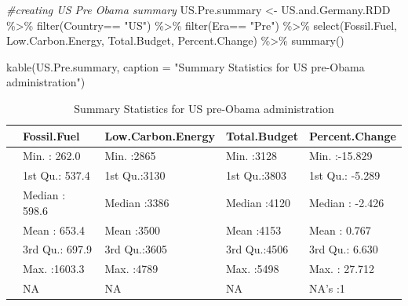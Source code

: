 \documentclass[
  12pt,
]{article}
\newenvironment{Shaded}{\begin{snugshade}}{\end{snugshade}}
\newcommand{\AttributeTok}[1]{\textcolor[rgb]{0.77,0.63,0.00}{#1}}
\newcommand{\CommentTok}[1]{\textcolor[rgb]{0.56,0.35,0.01}{\textit{#1}}}
\newcommand{\FunctionTok}[1]{\textcolor[rgb]{0.00,0.00,0.00}{#1}}
\newcommand{\NormalTok}[1]{#1}
\newcommand{\OtherTok}[1]{\textcolor[rgb]{0.56,0.35,0.01}{#1}}
\newcommand{\SpecialCharTok}[1]{\textcolor[rgb]{0.00,0.00,0.00}{#1}}
\newcommand{\StringTok}[1]{\textcolor[rgb]{0.31,0.60,0.02}{#1}}
\begin{document}
\begin{Shaded}
\begin{Highlighting}[]
\CommentTok{\#creating US Pre Obama summary}
\NormalTok{US.Pre.summary }\OtherTok{\textless{}{-}}\NormalTok{ US.and.Germany.RDD }\SpecialCharTok{\%\textgreater{}\%}
  \FunctionTok{filter}\NormalTok{(Country}\SpecialCharTok{==} \StringTok{"US"}\NormalTok{) }\SpecialCharTok{\%\textgreater{}\%}
  \FunctionTok{filter}\NormalTok{(Era}\SpecialCharTok{==} \StringTok{"Pre"}\NormalTok{) }\SpecialCharTok{\%\textgreater{}\%}
  \FunctionTok{select}\NormalTok{(Fossil.Fuel, Low.Carbon.Energy, Total.Budget, Percent.Change) }\SpecialCharTok{\%\textgreater{}\%}
  \FunctionTok{summary}\NormalTok{()}

\FunctionTok{kable}\NormalTok{(US.Pre.summary, }\AttributeTok{caption =} \StringTok{"Summary Statistics for US pre{-}Obama administration"}\NormalTok{)}
\end{Highlighting}
\end{Shaded}

\begin{table}

\caption{\label{tab:calculating the summary statistics for US and Germany and creating tables}Summary Statistics for US pre-Obama administration}
\centering
\begin{tabular}[t]{l|l|l|l|l}
\hline
  &  Fossil.Fuel & Low.Carbon.Energy &  Total.Budget & Percent.Change\\
\hline
 & Min.   : 262.0 & Min.   :2865 & Min.   :3128 & Min.   :-15.829\\
\hline
 & 1st Qu.: 537.4 & 1st Qu.:3130 & 1st Qu.:3803 & 1st Qu.: -5.289\\
\hline
 & Median : 598.6 & Median :3386 & Median :4120 & Median : -2.426\\
\hline
 & Mean   : 653.4 & Mean   :3500 & Mean   :4153 & Mean   :  0.767\\
\hline
 & 3rd Qu.: 697.9 & 3rd Qu.:3605 & 3rd Qu.:4506 & 3rd Qu.:  6.630\\
\hline
 & Max.   :1603.3 & Max.   :4789 & Max.   :5498 & Max.   : 27.712\\
\hline
 & NA & NA & NA & NA's   :1\\
\hline
\end{tabular}
\end{table}
\end{document}
